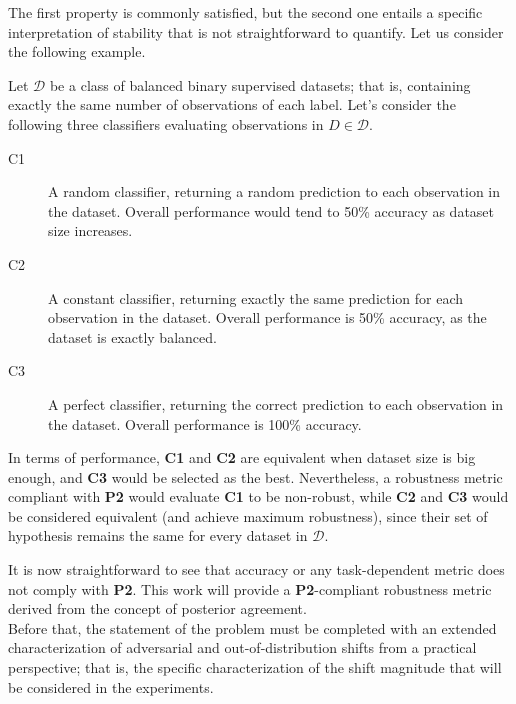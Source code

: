The first property is commonly satisfied, but the second one entails
a specific interpretation of stability that is not straightforward to
quantify. Let us consider the following example.

\begin{example}
    Let $\mathcal{D}$ be a class of balanced binary supervised datasets; that is,
    containing exactly the same number of observations of each 
    label. Let's consider the following 
    three classifiers evaluating observations in $D \in \mathcal{D}$.

    \begin{description}
        \item[C1] A random classifier, returning
        a random prediction to each observation in the dataset. Overall performance would 
        tend to 50\% accuracy as dataset size increases. 
        \item[C2] A constant classifier, returning exactly the same
        prediction for each observation in the dataset. Overall performance is 50\% accuracy,
        as the dataset is exactly balanced.
        \item[C3] A perfect classifier, returning the correct prediction
        to each observation in the dataset. Overall performance is 100\% accuracy. 
    \end{description}

    In terms of performance, \textbf{C1} and \textbf{C2} are equivalent when dataset 
    size is big enough, and \textbf{C3} would be selected as the best.
    Nevertheless, a robustness metric compliant with \textbf{P2} would
    evaluate \textbf{C1} to be non-robust, while \textbf{C2} and
    \textbf{C3} would be considered equivalent (and achieve maximum robustness), since their
    set of hypothesis remains the same for every dataset in $\mathcal{D}$.
\end{example}

It is now straightforward to see that accuracy or any task-dependent
metric does not comply with \textbf{P2}. This work will provide
a \textbf{P2}-compliant robustness metric derived from the
concept of posterior agreement. \\

Before that, the statement of the problem must be completed with
an extended characterization of adversarial and out-of-distribution 
shifts from a practical perspective; that is, the specific characterization
of the shift magnitude that will be considered in the experiments.

